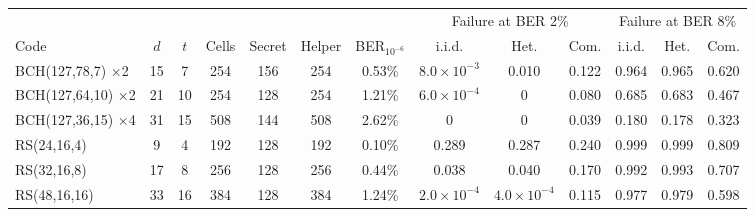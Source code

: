\begin{tabular}{lcccccccccccc}
\toprule
 & & & & & & & \multicolumn{3}{c}{Failure at BER 2\%} & \multicolumn{3}{c}{Failure at BER 8\%} \\
Code & $d$ & $t$ & Cells & Secret & Helper & BER$_{10^{-6}}$ & i.i.d. & Het. & Com. & i.i.d. & Het. & Com. \\
\midrule
BCH(127,78,7) $\times$2 & 15 & 7 & 254 & 156 & 254 & 0.53\% & $8.0\times10^{-3}$ & 0.010 & 0.122 & 0.964 & 0.965 & 0.620 \\
BCH(127,64,10) $\times$2 & 21 & 10 & 254 & 128 & 254 & 1.21\% & $6.0\times10^{-4}$ & 0 & 0.080 & 0.685 & 0.683 & 0.467 \\
BCH(127,36,15) $\times$4 & 31 & 15 & 508 & 144 & 508 & 2.62\% & 0 & 0 & 0.039 & 0.180 & 0.178 & 0.323 \\
RS(24,16,4) & 9 & 4 & 192 & 128 & 192 & 0.10\% & 0.289 & 0.287 & 0.240 & 0.999 & 0.999 & 0.809 \\
RS(32,16,8) & 17 & 8 & 256 & 128 & 256 & 0.44\% & 0.038 & 0.040 & 0.170 & 0.992 & 0.993 & 0.707 \\
RS(48,16,16) & 33 & 16 & 384 & 128 & 384 & 1.24\% & $2.0\times10^{-4}$ & $4.0\times10^{-4}$ & 0.115 & 0.977 & 0.979 & 0.598 \\
\bottomrule
\end{tabular}

